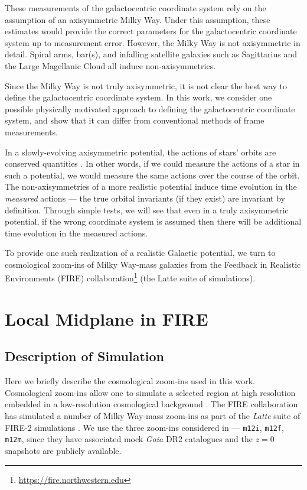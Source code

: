 \documentclass[twocolumn]{aastex62}
\begin{document}
These measurements of the galactocentric coordinate system rely on the
assumption of an axisymmetric Milky Way. Under this assumption, these
estimates would provide the correct parameters for the galactocentric
coordinate system up to measurement error. However, the Milky Way is not
axisymmetric in detail. Spiral arms, bar(s), and infalling satellite galaxies
such as Sagittarius and the Large Magellanic Cloud all induce
non-axisymmetries.

Since the Milky Way is not truly axisymmetric, it is not clear the best way to
define the galactocentric coordinate system. In this work, we consider one
possible physically motivated approach to defining the galactocentric
coordinate system, and show that it can differ from conventional methods of
frame measurements.

In a slowly-evolving axisymmetric potential, the actions of stars' orbits are
conserved quantities \citep{2008gady.book.....B,2014RvMP...86....1S}. In other
words, if we could measure the actions of a star in such a potential, we would
measure the same actions over the course of the orbit. The non-axisymmetries
of a more realistic potential induce time evolution in the {\em measured}
actions --- the true orbital invariants (if they exist) are invariant by
definition. Through simple tests, we will see that even in a truly
axisymmetric potential, if the wrong coordinate system is assumed then there
will be additional time evolution in the measured actions.

To provide one such realization of a realistic Galactic potential, we turn to
cosmological zoom-ins of Milky Way-mass galaxies from the Feedback in
Realistic Environments (FIRE)
collaboration\footnote{\url{https://fire.northwestern.edu}} (the Latte suite
of simulations).

\section{Local Midplane in FIRE} \label{sec:local_fire}
\subsection{Description of Simulation} \label{ssec:cosmozoom}
Here we briefly describe the cosmological zoom-ins used in this work.
Cosmological zoom-ins allow one to simulate a selected region at high
resolution embedded in a low-resolution cosmological background
\citep[e.g.][]{1993ApJ...412..455K,2014MNRAS.437.1894O}. The FIRE
collaboration has simulated a number of Milky Way-mass zoom-ins as part of the
{\em Latte} suite of FIRE-2 simulations
\citep{2016ApJ...827L..23W,2018MNRAS.481.4133G}. We use the three zoom-ins
considered in \citet{2018arXiv180610564S} --- \texttt{m12i}, \texttt{m12f},
\texttt{m12m}, since they have associated mock {\em Gaia} DR2 catalogues and
the $z=0$ snapshots are publicly available.
\end{document}

